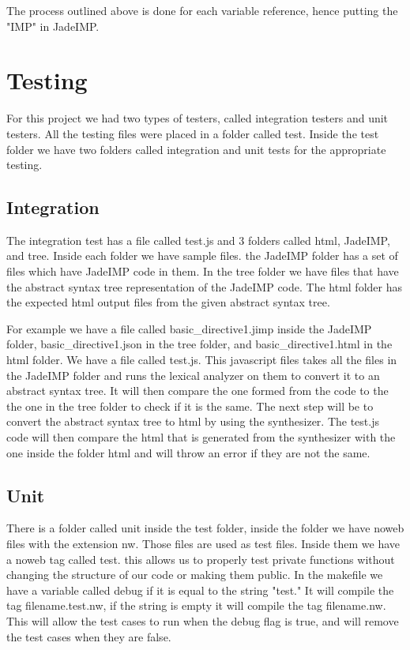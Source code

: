 \documentclass{article}
\begin{document}
The process outlined above is done for each variable reference, hence putting the "IMP" in JadeIMP.



\section{Testing}

For this project we had two types of testers, called integration testers and unit testers.
All the testing files were placed in a folder called test. Inside the test folder we have two folders called integration and unit tests for the appropriate testing.


\subsection{Integration}

The integration test has a file called test.js and 3 folders called html, JadeIMP, and tree.
Inside each folder we have sample files. the JadeIMP folder has a set of files which have JadeIMP code in them. In the tree folder we have files that have the abstract syntax tree representation of the JadeIMP code. The html folder has the expected html output files from the given abstract syntax tree.

For example we have a file called basic\_directive1.jimp inside the JadeIMP folder, basic\_directive1.json in the tree folder, and basic\_directive1.html in the html folder. We have a file called test.js. This javascript files takes all the files in the JadeIMP folder and runs the lexical analyzer on them to convert it to an abstract syntax tree. It will then compare the one formed from the code to the the one in the tree folder to check if it is the same. The next step will be to convert the abstract syntax tree to html by using the synthesizer. The test.js code will then compare the html that is generated from the synthesizer with the one inside the folder html and will throw an error if they are not the same.


\subsection{Unit}

There is a folder called unit inside the test folder, inside the folder we have noweb files with the extension nw. Those files are used as test files. Inside them we have a noweb tag called test. this allows us to properly test private functions without changing the structure of our code or making them public. In the makefile we have a variable called debug if it is equal to the string "test." It will compile the tag filename.test.nw, if the string is empty it will compile the tag filename.nw. This will allow the test cases to run when the debug flag is true, and will remove the test cases when they are false.
\end{document}
